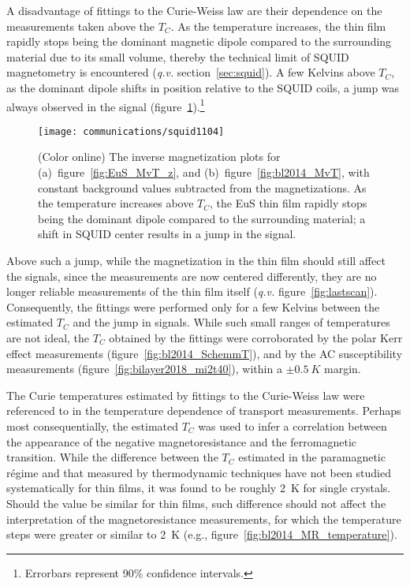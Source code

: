 A disadvantage of fittings to the Curie-Weiss law are their dependence on the measurements taken above the $T_C$. As the temperature increases, the thin film rapidly stops being the dominant magnetic dipole compared to the surrounding material due to its small volume, thereby the technical limit of SQUID magnetometry is encountered (\textit{q.v.} section~\ref{sec:squid}). A few Kelvins above $T_C$, as the dominant dipole shifts in position relative to the SQUID coils, a jump was always observed in the signal (figure~\ref{fig:inverse_M}).\footnote{Errorbars represent 90\% confidence intervals.}%
\begin{figure}[ht]%
    \centering%
    \texttt{[image: communications/squid1104]}%
    \caption[Inverse magnetization plots for EuS thin films]{\label{fig:inverse_M}(Color online) The inverse magnetization plots for (a)~figure~\ref{fig:EuS_MvT_z}, and (b)~figure~\ref{fig:bl2014_MvT}, with constant background values subtracted from the magnetizations. As the temperature increases above $T_C$, the EuS thin film rapidly stops being the dominant dipole compared to the surrounding material; a shift in SQUID center results in a jump in the signal.}%
\end{figure} %
%
Above such a jump, while the magnetization in the thin film should still affect the signals, since the measurements are now centered differently, they are no longer reliable measurements of the thin film itself (\textit{q.v.} figure~\ref{fig:lastscan}). Consequently, the fittings were performed only for a few Kelvins between the estimated $T_C$ and the jump in signals. While such small ranges of temperatures are not ideal, the $T_C$ obtained by the fittings were corroborated by the polar Kerr effect measurements (figure~\ref{fig:bl2014_SchemmT}), and by the AC susceptibility measurements (figure~\ref{fig:bilayer2018_mi2t40}), within a $\pm\SI{0.5}{K}$ margin.

The Curie temperatures estimated by fittings to the Curie-Weiss law were referenced to in the temperature dependence of transport measurements. Perhaps most consequentially, the estimated $T_C$ was used to infer a correlation between the appearance of the negative magnetoresistance and the ferromagnetic transition. While the difference between the $T_C$ estimated in the paramagnetic r\'egime and that measured by thermodynamic techniques have not been studied systematically for thin films, it was found to be roughly \SI{2}{K} for single crystals. Should the value be similar for thin films, such difference should not affect the interpretation of the magnetoresistance measurements, for which the temperature steps were greater or similar to \SI{2}{K} (e.g., figure~\ref{fig:bl2014_MR_temperature}).